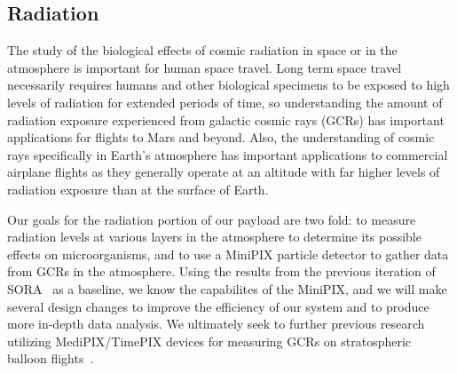 \subsection{Radiation}
\label{sec:RadiationBackground}

The study of the biological effects of cosmic radiation in space or in the atmosphere is important for human space travel.  Long term space travel necessarily requires humans and other biological specimens to be exposed to high levels of radiation for extended periods of time, so understanding the amount of radiation exposure experienced from galactic cosmic rays (GCRs) has important applications for flights to Mars and beyond. Also, the understanding of cosmic rays specifically in Earth's atmosphere has important applications to commercial airplane flights as they generally operate at an altitude with far higher levels of radiation exposure than at the surface of Earth. 

Our goals for the radiation portion of our payload are two fold: to measure radiation levels at various layers in the atmosphere to determine its possible effects on microorganisms, and to use a MiniPIX particle detector to gather data from GCRs in the atmosphere. Using the results from the previous iteration of SORA~\cite{SORA} as a baseline, we know the capabilites of the MiniPIX, and we will make several design changes to improve the efficiency of our system and to produce more in-depth data analysis. We ultimately seek to further previous research utilizing MediPIX/TimePIX devices for measuring GCRs on stratospheric balloon flights~\cite{bexus}. 



%
%



